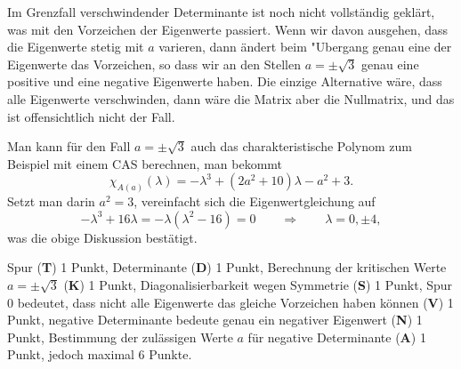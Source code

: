 \begin{diskussion}
Im Grenzfall verschwindender Determinante ist noch nicht vollständig
geklärt, was mit den Vorzeichen der Eigenwerte passiert.
Wenn wir davon ausgehen, dass die Eigenwerte stetig mit $a$ varieren,
dann ändert beim "Ubergang genau eine der Eigenwerte das Vorzeichen,
so dass wir an den Stellen $a=\pm\sqrt{3}$ genau eine positive und
eine negative Eigenwerte haben.
Die einzige Alternative wäre, dass alle Eigenwerte verschwinden,
dann wäre die Matrix aber die Nullmatrix, und das ist offensichtlich
nicht der Fall.

Man kann für den Fall $a=\pm\sqrt{3}$ auch das charakteristische Polynom
zum Beispiel mit einem CAS berechnen, man bekommt
\[
\chi_{A(a)}(\lambda)
=
-\lambda^3+(2a^2+10)\lambda-a^2+3.
\]
Setzt man darin $a^2=3$, vereinfacht sich die Eigenwertgleichung auf
\[
-\lambda^3 +16\lambda
=
-\lambda(\lambda^2 -16)=0
\qquad\Rightarrow\qquad \lambda = 0,\pm 4,
\]
was die obige Diskussion bestätigt.
\end{diskussion}

\begin{bewertung}
Spur ({\bf T}) 1 Punkt,
Determinante ({\bf D}) 1 Punkt,
Berechnung der kritischen Werte $a=\pm\sqrt{3}$ ({\bf K}) 1 Punkt,
Diagonalisierbarkeit wegen Symmetrie ({\bf S}) 1 Punkt,
Spur $0$ bedeutet, dass nicht alle Eigenwerte das gleiche Vorzeichen
haben können ({\bf V}) 1 Punkt,
negative Determinante bedeute genau ein negativer Eigenwert ({\bf N}) 1 Punkt,
Bestimmung der zulässigen Werte $a$ für negative Determinante ({\bf A})
1 Punkt, jedoch maximal 6 Punkte.
\end{bewertung}

